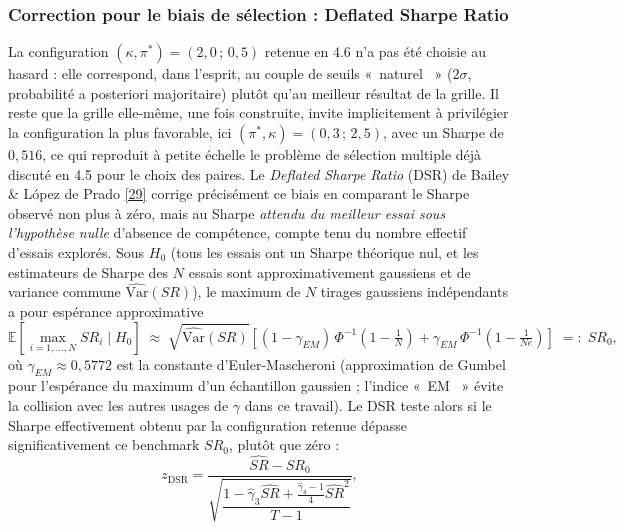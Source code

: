 \documentclass{article}
\providecommand{\og}{«~}
\providecommand{\fg}{~»}
\begin{document}
\subsubsection*{Correction pour le biais de sélection : Deflated Sharpe Ratio}
La configuration $(\kappa,\pi^\ast)=(2{,}0\,;\,0{,}5)$ retenue en 4.6 n'a pas été choisie au hasard : elle correspond, dans l'esprit, au couple de seuils \og naturel \fg{} ($2\sigma$, probabilité a posteriori majoritaire) plutôt qu'au meilleur résultat de la grille. Il reste que la grille elle-même, une fois construite, invite implicitement à privilégier la configuration la plus favorable, ici $(\pi^\ast,\kappa)=(0{,}3\,;\,2{,}5)$, avec un Sharpe de $0{,}516$, ce qui reproduit à petite échelle le problème de sélection multiple déjà discuté en 4.5 pour le choix des paires. Le \emph{Deflated Sharpe Ratio} (DSR) de Bailey \& López de Prado \hyperlink{ref29}{[29]} corrige précisément ce biais en comparant le Sharpe observé non plus à zéro, mais au Sharpe \emph{attendu du meilleur essai sous l'hypothèse nulle} d'absence de compétence, compte tenu du nombre effectif d'essais explorés.
Sous $H_0$ (tous les essais ont un Sharpe théorique nul, et les estimateurs de Sharpe des $N$ essais sont approximativement gaussiens et de variance commune $\widehat{\mathrm{Var}}(SR)$), le maximum de $N$ tirages gaussiens indépendants a pour espérance approximative
$$
\mathbb{E}[\max_{i=1,\dots,N} SR_i \mid H_0] \;\approx\; \sqrt{\widehat{\mathrm{Var}}(SR)}\left[(1-\gamma_{EM})\,\Phi^{-1}\!\left(1-\tfrac1N\right) + \gamma_{EM}\,\Phi^{-1}\!\left(1-\tfrac{1}{Ne}\right)\right] \;=:\; SR_0,
$$
où $\gamma_{EM}\approx 0{,}5772$ est la constante d'Euler-Mascheroni (approximation de Gumbel pour l'espérance du maximum d'un échantillon gaussien ; l'indice \og EM \fg{} évite la collision avec les autres usages de $\gamma$ dans ce travail). Le DSR teste alors si le Sharpe effectivement obtenu par la configuration retenue dépasse significativement ce benchmark $SR_0$, plutôt que zéro :
$$
z_{\text{DSR}} = \frac{\widehat{SR}-SR_0}{\sqrt{\dfrac{1-\hat\gamma_3 \widehat{SR}+\frac{\hat\gamma_4-1}{4}\widehat{SR}^2}{T-1}}},
$$
\end{document}
